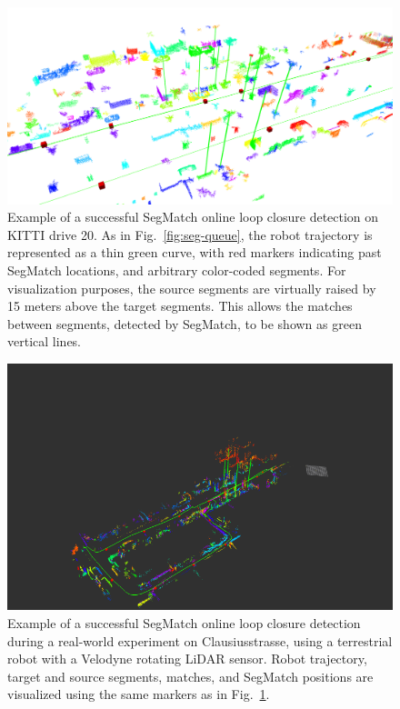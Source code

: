 \begin{figure}
  \centering
  \includegraphics[width=5.2in]{images/segmatchae.png}
  \caption{Example of a successful SegMatch online loop closure detection on KITTI drive 20. As in Fig.~\ref{fig:seg-queue}, the robot trajectory is represented as a thin green curve, with red markers indicating past SegMatch locations, and arbitrary color-coded segments. For visualization purposes, the source segments are virtually raised by 15 meters above the target segments. This allows the matches between segments, detected by SegMatch, to be shown as green vertical lines.}
  \label{fig:segmatch-loop-closure}
\end{figure}

\begin{figure}
  \centering
  \includegraphics[width=5.2in]{images/clausius2.png}
  \caption{Example of a successful SegMatch online loop closure detection during a real-world experiment on Clausiusstrasse, using a terrestrial robot with a Velodyne rotating LiDAR sensor. Robot trajectory, target and source segments, matches, and SegMatch positions are visualized using the same markers as in Fig.~\ref{fig:segmatch-loop-closure}.}
  \label{fig:clausius2}
\end{figure}

